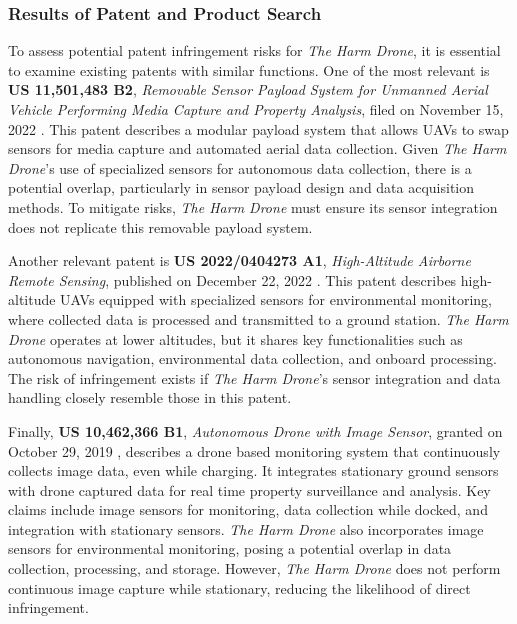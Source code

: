 \documentclass[12pt]{article}
\begin{document}
\subsubsection{Results of Patent and Product Search}

\par To assess potential patent infringement risks for \textit{The Harm Drone}, it is essential to examine existing patents with similar functions. One of the most relevant is \textbf{US 11,501,483 B2}, \textit{Removable Sensor Payload System for Unmanned Aerial Vehicle Performing Media Capture and Property Analysis}, filed on November 15, 2022 \cite{patent1}. This patent describes a modular payload system that allows UAVs to swap sensors for media capture and automated aerial data collection. Given \textit{The Harm Drone}’s use of specialized sensors for autonomous data collection, there is a potential overlap, particularly in sensor payload design and data acquisition methods. To mitigate risks, \textit{The Harm Drone} must ensure its sensor integration does not replicate this removable payload system.

\par Another relevant patent is \textbf{US 2022/0404273 A1}, \textit{High-Altitude Airborne Remote Sensing}, published on December 22, 2022 \cite{patent2}. This patent describes high-altitude UAVs equipped with specialized sensors for environmental monitoring, where collected data is processed and transmitted to a ground station. \textit{The Harm Drone} operates at lower altitudes, but it shares key functionalities such as autonomous navigation, environmental data collection, and onboard processing. The risk of infringement exists if \textit{The Harm Drone}’s sensor integration and data handling closely resemble those in this patent.

\par Finally, \textbf{US 10,462,366 B1}, \textit{Autonomous Drone with Image Sensor}, granted on October 29, 2019 \cite{patent3}, describes a drone based monitoring system that continuously collects image data, even while charging. It integrates stationary ground sensors with drone captured data for real time property surveillance and analysis. Key claims include image sensors for monitoring, data collection while docked, and integration with stationary sensors. \textit{The Harm Drone} also incorporates image sensors for environmental monitoring, posing a potential overlap in data collection, processing, and storage. However, \textit{The Harm Drone} does not perform continuous image capture while stationary, reducing the likelihood of direct infringement.
\end{document}
